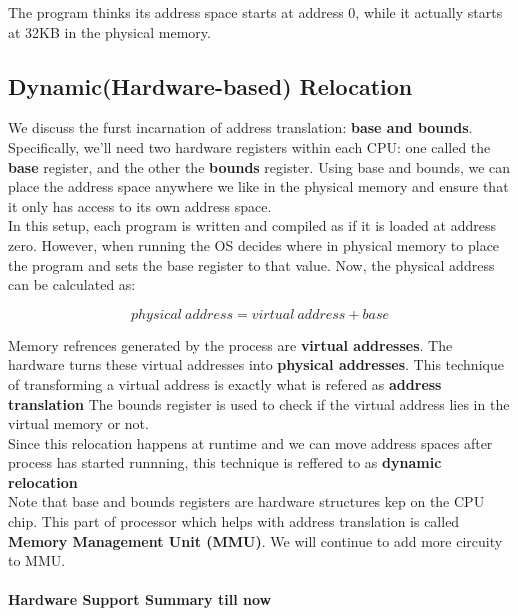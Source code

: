 The program thinks its address space starts at address 0, while it actually
starts at 32KB in the physical memory.

\subsection{Dynamic(Hardware-based) Relocation}

We discuss the furst incarnation of address translation:
\textbf{base and bounds}.\\

Specifically, we'll need two hardware registers within each CPU: one called
the \textbf{base} register, and the other the \textbf{bounds} register. Using
base and bounds, we can place the address space anywhere we like in the 
physical memory and ensure that it only has access to its own address space.\\

In this setup, each program is written and compiled as if it is loaded at
address zero. However, when running the OS decides where in physical memory
to place the program and sets the base register to that value. Now, the 
physical address can be calculated as:

$$
physical\ address = virtual\ address + base
$$

Memory refrences generated by the process are \textbf{virtual addresses}. The
hardware turns these virtual addresses into \textbf{physical addresses}.
This technique of transforming a virtual address is exactly what is refered as
\textbf{address translation}
The bounds register is used to check if the virtual address lies in the virtual
memory or not.\\

Since this relocation happens at runtime and we can move address spaces after
process has started runnning, this technique is reffered to as \textbf{dynamic
relocation}\\

Note that base and bounds registers are hardware structures kep on the CPU
chip. This part of processor which helps with address translation is called
\textbf{Memory Management Unit (MMU)}. We will continue to add more circuity
to MMU.\\

\paragraph{Hardware Support Summary till now}

